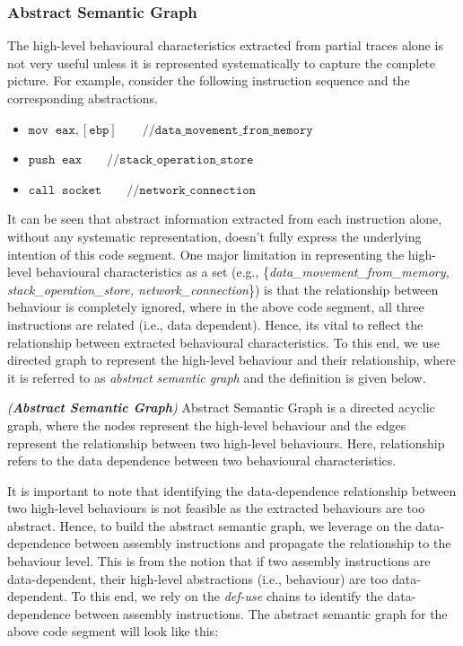 \subsubsection{Abstract Semantic Graph} 
The high-level behavioural characteristics extracted from partial traces alone is not very useful unless it is represented systematically to capture the complete picture. For example, consider the following instruction sequence and the corresponding abstractions.

\begin{itemize}
\itemsep0em 
  \item[] $\mathtt{mov \;\; eax, [ebp] \quad\quad// data\_movement\_from\_memory}$
  \item[] $\mathtt{push \;\; eax \quad\quad// stack\_operation\_store}$
  \item[] $\mathtt{call \;\; socket \quad\quad// network\_connection}$
\end{itemize}
 
It can be seen that abstract information extracted from each instruction alone, without any systematic representation, doesn't fully express the underlying intention of this code segment. One major limitation in representing the high-level behavioural characteristics  as a set (e.g., 
\{\textit{data\_movement\_from\_memory, stack\_operation\_store, network\_connection}\}) is that the relationship between behaviour is completely ignored, where in the above code segment, all three instructions are related (i.e., data dependent). Hence, its vital to reflect the relationship between extracted behavioural characteristics. To this end, we use directed graph to represent the high-level behaviour and their relationship, where it is referred to as \textit{abstract semantic graph} and the definition is given below.

\begin{mydef}
\emph{(\textbf{Abstract Semantic Graph}) }  Abstract Semantic Graph is a directed acyclic graph, where the nodes represent the high-level behaviour and the edges represent the relationship between two high-level behaviours. Here, relationship refers to the data dependence between two behavioural characteristics.
\end{mydef}

It is important to note that identifying the data-dependence relationship between two high-level behaviours is not feasible as the extracted behaviours are too abstract. Hence, to build the abstract semantic graph, we leverage on the data-dependence between assembly instructions and propagate the relationship to the behaviour level. This is from the notion that if two assembly instructions are data-dependent, their high-level abstractions (i.e., behaviour) are too data-dependent. To this end, we rely on the \textit{def-use} chains to identify the data-dependence between assembly instructions. The abstract semantic graph for the above code segment will look like this: 

